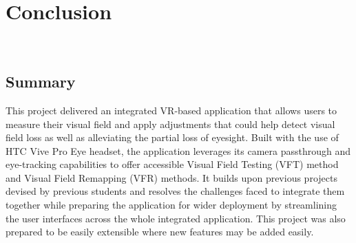 \documentclass{l4proj}
\begin{document}
\chapter{Conclusion}
\

\section{Summary}

This project delivered an integrated VR-based application that allows users to measure their visual field and apply adjustments that could help detect visual field loss as well as alleviating the partial loss of eyesight. Built with the use of HTC Vive Pro Eye headset, the application leverages its camera passthrough and eye-tracking capabilities to offer accessible Visual Field Testing (VFT) method and Visual Field Remapping (VFR) methods. It builds upon previous projects devised by previous students and resolves the challenges faced to integrate them together while preparing the application for wider deployment by streamlining the user interfaces across the whole integrated application. This project was also prepared to be easily extensible where new features may be added easily.
\end{document}
